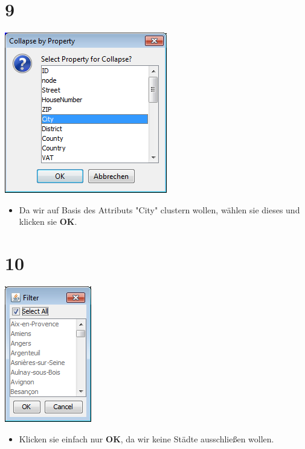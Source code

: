\documentclass{beamer}
\begin{document}
\section{9}
\begin{frame}
	\begin{center}
  		\includegraphics[height=0.5\textheight]{9.png}
	\end{center}
	\begin{itemize}
		\item Da wir auf Basis des Attributs "City" clustern wollen, wählen sie dieses und klicken sie \textbf{OK}.
	\end{itemize}
\end{frame}

\section{10}
\begin{frame}
	\begin{center}
  		\includegraphics[height=0.5\textheight]{10.png}
	\end{center}
	\begin{itemize}
		\item Klicken sie einfach nur \textbf{OK}, da wir keine Städte ausschließen wollen.
	\end{itemize}
\end{frame}
\end{document}
